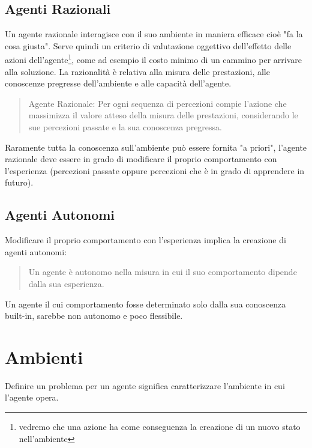 \documentclass{article}
\begin{document}
\subsection{Agenti Razionali}
Un agente razionale interagisce con il suo ambiente in maniera efficace cioè "fa la cosa giusta". Serve quindi un criterio di valutazione oggettivo dell'effetto delle azioni dell'agente\footnote{vedremo che una azione ha come conseguenza la creazione di un nuovo stato nell'ambiente}, come ad esempio il costo minimo di un cammino per arrivare alla soluzione. La razionalità è relativa alla misura delle prestazioni, alle conoscenze pregresse dell'ambiente e alle capacità dell'agente.
\begin{quote}
    Agente Razionale: Per ogni sequenza di percezioni compie l'azione che massimizza il valore atteso della misura delle prestazioni, considerando le sue percezioni passate e la sua conoscenza pregressa.
\end{quote}
Raramente tutta la conoscenza sull'ambiente può essere fornita "a priori", l'agente razionale deve essere in grado di modificare il proprio comportamento con l'esperienza (percezioni passate oppure percezioni che è in grado di apprendere in futuro).

\subsection{Agenti Autonomi}
Modificare il proprio comportamento con l'esperienza implica la creazione di agenti autonomi:
\begin{quote}
    Un agente è autonomo nella misura in cui il suo comportamento dipende dalla sua esperienza. 
\end{quote}
Un agente il cui comportamento fosse determinato solo dalla sua conoscenza built-in, sarebbe non autonomo e poco flessibile.

\section{Ambienti}
Definire un problema per un agente significa caratterizzare l'ambiente in cui l'agente opera.
\end{document}
